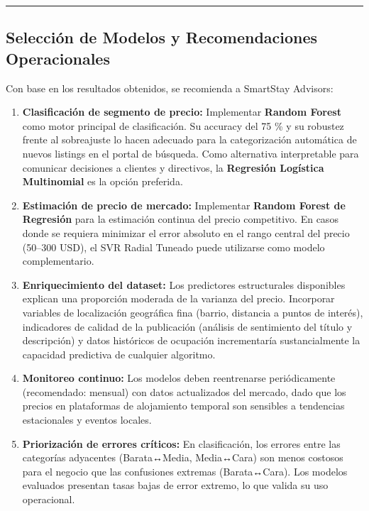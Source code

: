\documentclass[
]{article}
\begin{document}
\begin{center}\rule{0.5\linewidth}{0.5pt}\end{center}

\subsection{Selección de Modelos y Recomendaciones
Operacionales}\label{selecciuxf3n-de-modelos-y-recomendaciones-operacionales}

Con base en los resultados obtenidos, se recomienda a SmartStay
Advisors:

\begin{enumerate}
\def\labelenumi{\arabic{enumi}.}
\item
  \textbf{Clasificación de segmento de precio:} Implementar
  \textbf{Random Forest} como motor principal de clasificación. Su
  accuracy del 75 \% y su robustez frente al sobreajuste lo hacen
  adecuado para la categorización automática de nuevos listings en el
  portal de búsqueda. Como alternativa interpretable para comunicar
  decisiones a clientes y directivos, la \textbf{Regresión Logística
  Multinomial} es la opción preferida.
\item
  \textbf{Estimación de precio de mercado:} Implementar \textbf{Random
  Forest de Regresión} para la estimación continua del precio
  competitivo. En casos donde se requiera minimizar el error absoluto en
  el rango central del precio (50--300 USD), el SVR Radial Tuneado puede
  utilizarse como modelo complementario.
\item
  \textbf{Enriquecimiento del dataset:} Los predictores estructurales
  disponibles explican una proporción moderada de la varianza del
  precio. Incorporar variables de localización geográfica fina (barrio,
  distancia a puntos de interés), indicadores de calidad de la
  publicación (análisis de sentimiento del título y descripción) y datos
  históricos de ocupación incrementaría sustancialmente la capacidad
  predictiva de cualquier algoritmo.
\item
  \textbf{Monitoreo continuo:} Los modelos deben reentrenarse
  periódicamente (recomendado: mensual) con datos actualizados del
  mercado, dado que los precios en plataformas de alojamiento temporal
  son sensibles a tendencias estacionales y eventos locales.
\item
  \textbf{Priorización de errores críticos:} En clasificación, los
  errores entre las categorías adyacentes (Barata↔Media, Media↔Cara) son
  menos costosos para el negocio que las confusiones extremas
  (Barata↔Cara). Los modelos evaluados presentan tasas bajas de error
  extremo, lo que valida su uso operacional.
\end{enumerate}
\end{document}
